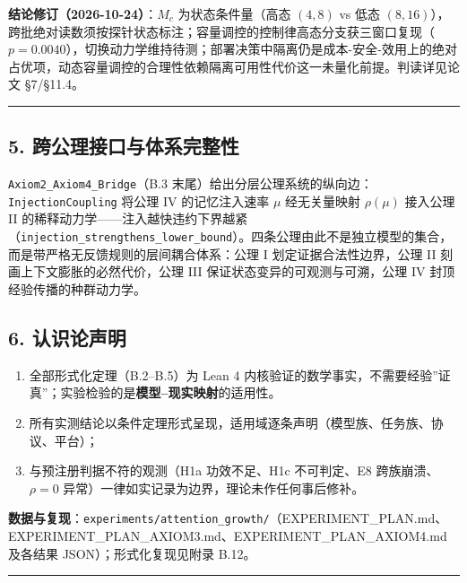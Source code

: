 \textbf{结论修订（2026-10-24）}：\(M_c\) 为状态条件量（高态 \((4,8)\) vs
低态
\((8,16)\)），跨批绝对读数须按探针状态标注；容量调控的控制律高态分支获三窗口复现（\(p{=}0.0040\)），切换动力学维持待测；部署决策中隔离仍是成本-安全-效用上的绝对占优项，动态容量调控的合理性依赖隔离可用性代价这一未量化前提。判读详见论文
§7/§11.4。

\begin{center}\rule{0.5\linewidth}{0.5pt}\end{center}

\subsection{5.
跨公理接口与体系完整性}\label{ux8de8ux516cux7406ux63a5ux53e3ux4e0eux4f53ux7cfbux5b8cux6574ux6027}

\texttt{Axiom2\_Axiom4\_Bridge}（B.3
末尾）给出分层公理系统的纵向边：\texttt{InjectionCoupling} 将公理 IV
的记忆注入速率 \(\mu\) 经无关量映射 \(\rho(\mu)\) 接入公理 II
的稀释动力学------注入越快违约下界越紧（\texttt{injection\_strengthens\_lower\_bound}）。四条公理由此不是独立模型的集合，而是带严格无反馈规则的层间耦合体系：公理
I 划定证据合法性边界，公理 II 刻画上下文膨胀的必然代价，公理 III
保证状态变异的可观测与可溯，公理 IV 封顶经验传播的种群动力学。

\subsection{6. 认识论声明}\label{ux8ba4ux8bc6ux8bbaux58f0ux660e}

\begin{enumerate}
\def\labelenumi{\arabic{enumi}.}
\tightlist
\item
  全部形式化定理（B.2--B.5）为 Lean 4
  内核验证的数学事实，不需要经验''证真''；实验检验的是\textbf{模型--现实映射}的适用性。
\item
  所有实测结论以条件定理形式呈现，适用域逐条声明（模型族、任务族、协议、平台）；
\item
  与预注册判据不符的观测（H1a 功效不足、H1c 不可判定、E8
  跨族崩溃、\(\rho=0\) 异常）一律如实记录为边界，理论未作任何事后修补。
\end{enumerate}

\textbf{数据与复现}：\texttt{experiments/attention\_growth/}（EXPERIMENT\_PLAN.md、EXPERIMENT\_PLAN\_AXIOM3.md、EXPERIMENT\_PLAN\_AXIOM4.md
及各结果 JSON）；形式化复现见附录 B.12。

\begin{center}\rule{0.5\linewidth}{0.5pt}\end{center}

